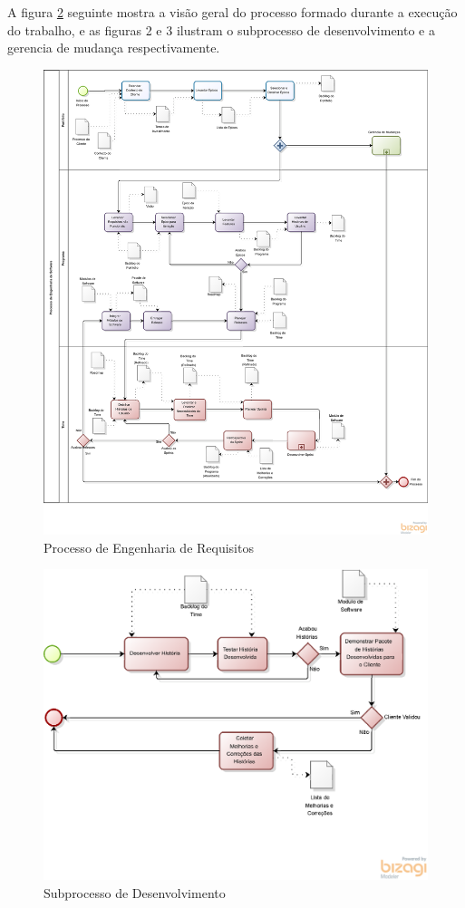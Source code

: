 A figura \ref{fig:processo} seguinte mostra a visão geral do processo formado durante a execução do trabalho, e as figuras 2 e 3 ilustram o subprocesso de desenvolvimento e a gerencia de mudança respectivamente.


\begin{figure}[H]
    \centering
	\includegraphics[trim = 0mm 25mm 0mm 0mm,clip,keepaspectratio=true,scale=0.5]{figuras/processo_req.eps}
    \caption{Processo de Engenharia de Requisitos}
    \label{fig:processo}
\end{figure}

\begin{figure}[H]
    \centering
	\includegraphics[keepaspectratio=true,scale=0.5]{figuras/desenvolves.eps}
    \caption{Subprocesso de Desenvolvimento}
    \label{fig:processo}
\end{figure}

